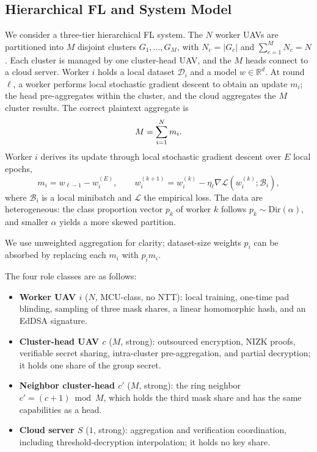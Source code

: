 \subsection{Hierarchical FL and System Model}
\label{subsec:systemmodel}
We consider a three-tier hierarchical FL system. The $N$ worker UAVs are partitioned into $M$ disjoint clusters $G_1,\ldots,G_M$, with $N_c=|G_c|$ and $\sum_{c=1}^{M}N_c=N$. Each cluster is managed by one cluster-head UAV, and the $M$ heads connect to a cloud server. Worker $i$ holds a local dataset $\mathcal{D}_i$ and a model $w\in\mathbb{R}^{d}$. At round $\ell$, a worker performs local stochastic gradient descent to obtain an update $m_i$; the head pre-aggregates within the cluster, and the cloud aggregates the $M$ cluster results. The correct plaintext aggregate is
\begin{equation}
  \label{eq:plaintext-agg}
  M=\sum_{i=1}^{N} m_i .
\end{equation}
Worker $i$ derives its update through local stochastic gradient descent over $E$ local epochs,
\begin{equation}
  \label{eq:local-update}
  m_i = w_{\ell-1}-w_i^{(E)},\qquad
  w_i^{(k+1)} = w_i^{(k)} - \eta_{\ell}\nabla\mathcal{L}(w_i^{(k)};\mathcal{B}_i),
\end{equation}
where $\mathcal{B}_i$ is a local minibatch and $\mathcal{L}$ the empirical loss. The data are heterogeneous: the class proportion vector $p_k$ of worker $k$ follows $p_k\sim\mathrm{Dir}(\alpha)$, and smaller $\alpha$ yields a more skewed partition.

We use unweighted aggregation for clarity; dataset-size weights $p_i$ can be absorbed by replacing each $m_i$ with $p_i m_i$.

The four role classes are as follows:
\begin{itemize}[leftmargin=*,topsep=2pt,itemsep=1pt]
  \item \textbf{Worker UAV $i$} ($N$, MCU-class, no NTT): local training, one-time pad blinding, sampling of three mask shares, a linear homomorphic hash, and an EdDSA signature.
  \item \textbf{Cluster-head UAV $c$} ($M$, strong): outsourced encryption, NIZK proofs, verifiable secret sharing, intra-cluster pre-aggregation, and partial decryption; it holds one share of the group secret.
  \item \textbf{Neighbor cluster-head $c'$} ($M$, strong): the ring neighbor $c'=(c+1)\bmod M$, which holds the third mask share and has the same capabilities as a head.
  \item \textbf{Cloud server $S$} ($1$, strong): aggregation and verification coordination, including threshold-decryption interpolation; it holds no key share.
\end{itemize}


